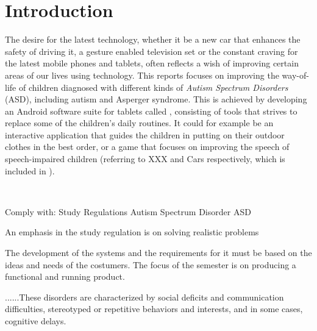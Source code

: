 \newcommand{\headerIntroduction}{Introduction}
\chapter*{\headerIntroduction}\label{chap:introduction}
\addcontentsline{toc}{chapter}{\headerIntroduction}

The desire for the latest technology, whether it be a new car that enhances the safety of driving it, a gesture enabled television set or the constant craving for the latest mobile phones and tablets, often reflects a wish of improving certain areas of our lives using technology.
This reports focuses on improving the way-of-life of children diagnosed with different kinds of \textit{Autism Spectrum Disorders} (ASD), including autism and Asperger syndrome.
This is achieved by developing an Android software suite for tablets called \giraf, consisting of tools that strives to replace some of the children's daily routines.
It could for example be an interactive application that guides the children in putting on their outdoor clothes in the best order, or a game that focuses on improving the speech of speech-impaired children (referring to XXX and Cars respectively, which is included in \giraf).

~\linebreak[2]

Comply with:
Study Regulations
Autism Spectrum Disorder ASD

An emphasis in the study 
regulation is on solving realistic problems

The development of the systems and the requirements for it must be based on the ideas and needs of 
the costumers. The focus of the semester is on producing a functional and running product.


......These disorders are characterized by social deficits and communication difficulties, stereotyped or repetitive behaviors and interests, and in some cases, cognitive delays.
